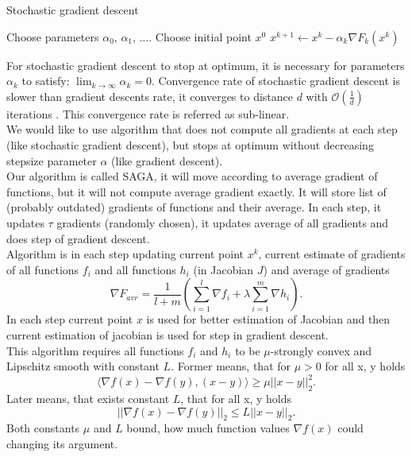 \documentclass[11pt]{book}
\begin{document}
\begin{algorithm}[H]
	\caption{Stochastic gradient descent}
	\label{alg:sgd}
	\begin{algorithmic}[1]
		\State Choose parameters $\alpha_0$, $\alpha_1$, $\dots$.
		\State Choose initial point $x^0$
		\State $x^{k+1} \leftarrow x^k - \alpha_k\nabla F_k(x^k) $
		\EndFor
	\end{algorithmic}
\end{algorithm}

For stochastic gradient descent to stop at optimum, it is necessary for parameters $\alpha_k$ to satisfy: $\lim_{k \rightarrow \infty}\alpha_k=0 $. Convergence rate of stochastic gradient descent is slower than gradient descents rate, it converges to distance $d$ with $\mathcal{O}(\frac{1}{d})$ iterations \cite{SGD}. This convergence rate is referred as sub-linear.\\

We would like to use algorithm that does not compute all gradients at each step (like stochastic gradient descent), but stops at optimum without decreasing stepsize parameter $\alpha$ (like gradient descent).\\

Our algorithm is called SAGA, it will move according to average gradient of functions, but it will not compute average gradient exactly. It will store list of (probably outdated) gradients of functions and their average. In each step, it updates $\tau$ gradients (randomly chosen), it updates average of all gradients and does step of gradient descent.\\

Algorithm is in each step updating current point $x^k$, current estimate of gradients of all functions $f_i$ and all functions $h_i$ (in Jacobian $J$) and average of gradients $$\nabla F_{avr}= \frac{1}{l+m}\left( \sum_{i=1}^l \nabla f_i + \lambda\sum_{i=1}^m \nabla h_i \right).$$ In each step current point $x$ is used for better estimation of Jacobian and then current estimation of jacobian is used for step in gradient descent.\\

This algorithm requires all functions $f_i$ and $h_i$ to be $\mu$-strongly convex and Lipschitz smooth with constant $L$. Former means, that for $\mu>0$ for all x, y holds $$\langle \nabla f(x) - \nabla f(y), (x-y) \rangle \geq \mu ||x-y||_2^2. $$
Later means, that exists constant $L$, that for all x, y holds $$||\nabla f(x) - \nabla f(y)||_2 \leq L ||x-y||_2.$$ Both constants $\mu$ and $L$ bound, how much function values $\nabla f(x)$ could changing its argument.
\end{document}

